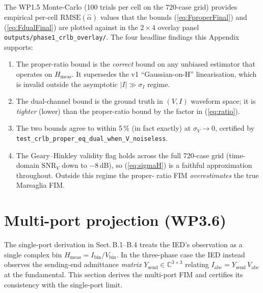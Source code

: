\documentclass[11pt,a4paper]{article}
\begin{document}
The WP1.5 Monte-Carlo (100 trials per cell on the 720-case grid)
provides empirical per-cell $\mathrm{RMSE}(\hat\alpha)$ values that
the bounds (\ref{eq:FproperFinal}) and (\ref{eq:FdualFinal}) are
plotted against in the $2\times 4$ overlay panel
\texttt{outputs/phase1\_crlb\_overlay/}.  The four headline findings
this Appendix supports:

\begin{enumerate}[leftmargin=2em]
  \item The proper-ratio bound is the \emph{correct} bound on any
        unbiased estimator that operates on $H_{\mathrm{meas}}$.
        It supersedes the v1 ``Gaussian-on-H'' linearisation,
        which is invalid outside the asymptotic
        $|I| \gg \sigma_I$ regime.
  \item The dual-channel bound is the ground truth in $(V, I)$
        waveform space; it is \emph{tighter} (lower) than the
        proper-ratio bound by the factor in (\ref{eq:ratio}).
  \item The two bounds agree to within 5\,\% (in fact exactly) at
        $\sigma_V \to 0$, certified by
        \texttt{test\_crlb\_proper\_eq\_dual\_when\_V\_noiseless}.
  \item The Geary--Hinkley validity flag holds across the full
        720-case grid (time-domain $\mathrm{SNR}_V$ down to
        $-8$\,dB), so (\ref{eq:sigmaH}) is a faithful
        approximation throughout.  Outside this regime the proper-
        ratio FIM \emph{overestimates} the true Marsaglia FIM.
\end{enumerate}

\section{Multi-port projection (WP3.6)}
\label{sec:appB_multiport}

The single-port derivation in Sect.\,B.1--B.4 treats the IED's
observation as a single complex bin $H_{\mathrm{meas}} =
I_{\mathrm{bin}}/V_{\mathrm{bin}}$.  In the three-phase case the
IED instead observes the sending-end admittance \emph{matrix}
$Y_{\mathrm{send}}\in\mathbb{C}^{3\times 3}$ relating
$I_{\mathrm{abc}} = Y_{\mathrm{send}}\, V_{\mathrm{abc}}$ at the
fundamental.  This section derives the multi-port FIM and certifies
its consistency with the single-port limit.
\end{document}
